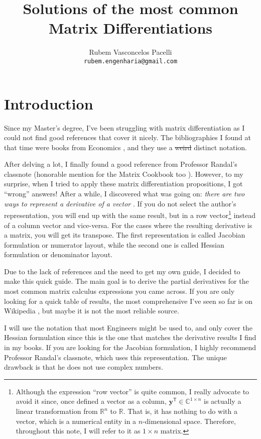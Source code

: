 \documentclass{article}
\title{\textbf{Solutions of the most common Matrix Differentiations}  \vspace{-.3cm}}
\author{Rubem Vasconcelos Pacelli\\
  {\tt rubem.engenharia@gmail.com}}
\affil{Department of Teleinformatics Engineering, Federal University of Ceará.\\Fortaleza, Ceará, Brazil. \vspace{-.5cm}}
\newcommand{\trans}{\mathsf{T}}
\begin{document}
\maketitle
\tableofcontents

\section{Introduction}
Since my Master's degree, I've been struggling with matrix differentiation as I could not find good references that cover it nicely. The bibliographies I found at that time were books from Economics \cite{dhrymes1978mathematics}, and they use a \st{weird} distinct notation.

After delving a lot, I finally found a good reference from Professor Randal's classnote \cite{barnes2006matrix} (honorable mention for the Matrix Cookbook too \cite{petersen2008matrix}). However, to my surprise, when I tried to apply these matrix differentiation propositions, I got ``wrong'' answers! After a while, I discovered what was going on: \emph{there are two ways to represent a derivative of a vector} \cite{Singh}. If you do not select the author's representation, you will end up with the same result, but in a row vector\footnote{Although the expression ``row vector'' is quite common, I really advocate to avoid it since, once defined a vector as a column, \(\mathbf{y}^{\trans} \in \mathbb{C}^{1\times n}\) is actually a linear transformation from \(\mathbb{R}^{n}\) to \(\mathbb{R}\). That is, it has nothing to do with a vector, which is a numerical entity in a \(n\)-dimensional space. Therefore, throughout this note, I will refer to it as \(1\times n\) matrix.} instead of a column vector and vice-versa. For the cases where the resulting derivative is a matrix, you will get its transpose. The first representation is called Jacobian formulation or numerator layout, while the second one is called Hessian formulation or denominator layout.

Due to the lack of references and the need to get my own guide, I decided to make this quick guide. The main goal is to derive the partial derivatives for the most common matrix calculus expressions you came across. If you are only looking for a quick table of results, the most comprehensive I've seen so far is on Wikipedia \cite{Matrixca44:online}, but maybe it is not the most reliable source.

I will use the notation that most Engineers might be used to, and only cover the Hessian formulation since this is the one that matches the derivative results I find in my books. If you are looking for the Jacobian formulation, I highly recommend Professor Randal's classnote, which uses this representation. The unique drawback is that he does not use complex numbers.
\end{document}
